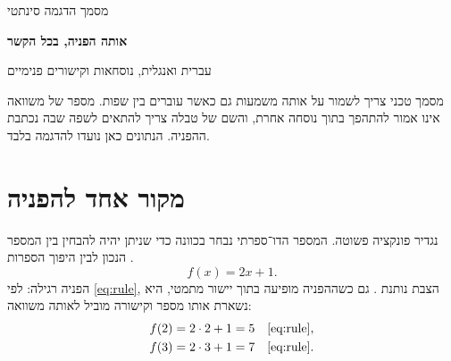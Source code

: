 \def\lakitdocumentclass{article}
\def\lakitclassoptions{11pt,a4paper}
\def\lakitgeometryoptions{margin=2.15cm,headheight=14pt}
\def\lakitlinespread{1.16}




{\small\sffamily\noindent מסמך הדגמה סינתטי\par}\medskip
{\LARGE\sffamily\bfseries\noindent אותה הפניה, בכל הקשר\par}\smallskip
{\large\noindent עברית ואנגלית, נוסחאות וקישורים פנימיים\par}\bigskip
מסמך טכני צריך לשמור על אותה משמעות גם כאשר עוברים בין שפות. מספר של
משוואה אינו אמור להתהפך בתוך נוסחה אחרת, והשם של טבלה צריך להתאים לשפה שבה
נכתבת ההפניה. הנתונים כאן נועדו להדגמה בלבד.
\section{מקור אחד להפניה}
נגדיר פונקציה פשוטה. המספר הדו־ספרתי נבחר בכוונה כדי שניתן יהיה להבחין בין
המספר הנכון  לבין היפוך הספרות .
\setcounter{equation}{11}
\begin{equation}\label{eq:rule}
f(x)=2x+1.
\end{equation}
הפניה רגילה: לפי \eqref{eq:rule}, הצבת  נותנת . גם כשההפניה
מופיעה בתוך יישור מתמטי, היא נשארת אותו מספר וקישורה מוביל לאותה משוואה:
\begin{align*}
f(2)&=2\cdot2+1=5 &&\text{\eqref{eq:rule}},\\
f(3)&=2\cdot3+1=7 &&\text{\eqref{eq:rule}}.
\end{align*}
